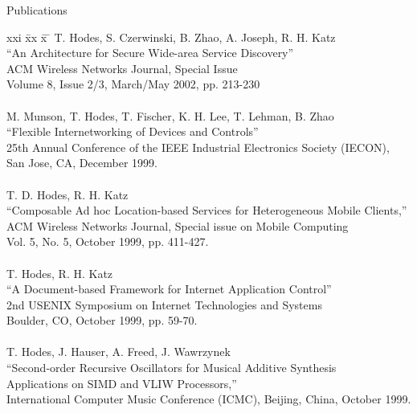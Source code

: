 
\begin{bf} \large
Publications
\end{bf}
\begin{tabbing}
xxi \= xx \= x \= \kill
\>    T. Hodes, S. Czerwinski, B. Zhao, A. Joseph, R. H. Katz \\
\>\>      ``An Architecture for Secure Wide-area Service Discovery'' \\
\>\>       ACM Wireless Networks Journal, Special Issue \\
\>\>       Volume 8, Issue 2/3, March/May 2002, pp. 213-230 \\

\smallskip \\[-3pt]
\>   M. Munson, T. Hodes, T. Fischer, K. H. Lee, T. Lehman, B. Zhao \\
\>\>      ``Flexible Internetworking of Devices and Controls'' \\
\>\>        25th Annual Conference of the IEEE Industrial Electronics Society (IECON),  \\
\>\>	    San Jose, CA, December 1999. \\
\smallskip \\[-3pt]
\>    T. D. Hodes, R. H. Katz \\
\>\>      ``Composable Ad hoc Location-based Services for Heterogeneous
             Mobile Clients,'' \\
\>\>       ACM Wireless Networks Journal, Special issue on Mobile Computing \\
\>\>       Vol. 5, No. 5, October 1999, pp. 411-427. \\
\smallskip \\[-3pt]
\>    T. Hodes, R. H. Katz \\
\>\>      ``A Document-based Framework for Internet Application Control'' \\
\>\>       2nd USENIX Symposium on Internet Technologies and Systems \\
\>\>       Boulder, CO, October 1999, pp. 59-70. \\
\smallskip \\[-3pt]
\>    T. Hodes, J. Hauser, A. Freed, J. Wawrzynek\\
\>\>      ``Second-order Recursive Oscillators for Musical Additive Synthesis \\
\>\>\>        Applications on SIMD and VLIW Processors,'' \\
\>\>       International Computer Music Conference (ICMC), Beijing, China, October 1999. \\
\end{tabbing}

